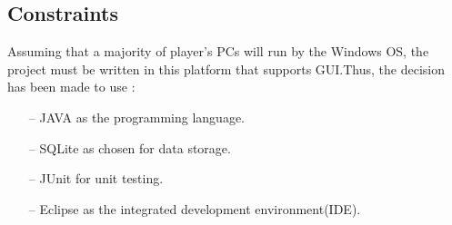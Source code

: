 \documentclass[10pt, a4paper]{article}
\begin{document}
	
	\subsection{Constraints}
	
	Assuming that a majority of player's PCs will run by the Windows OS, the project must be written in this platform that supports GUI.Thus, the decision has been made to use :
	\begin{itemize}
		\item[--] JAVA as the programming language.
		\item[--] SQLite as chosen for data storage.
		\item[--] JUnit for unit testing.
		\item[--] Eclipse as the integrated development environment(IDE).
	\end{itemize}
	
\end{document}
